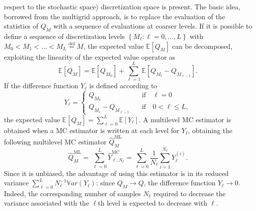 respect to the stochastic space) discretization space is present. The basic idea, borrowed from the multigrid approach,
is to replace the evaluation of the statistics of $Q_M$ with a sequence of evaluations at coarser levels. If it is 
possible to define a sequence of discretization levels $\left\{ M_\ell: \ell = 0, \dots, L \right\}$ with 
$M_0 < M_1 < \dots < M_L \stackrel{\mathrm{def}}{=} M$, the expected value $\mathbb{E}\left[{Q_M}\right]$ can be decomposed, 
exploiting the linearity of the expected value operator as
\begin{equation}
 \mathbb{E}\left[{Q_{M}}\right] = \mathbb{E}\left[{Q_{M_0}}\right] + \sum_{\ell = 1}^L \mathbb{E }\left[ Q_{M_{\ell}} - Q_{M_{\ell-1}} \right].
\end{equation}
If the difference function $Y_\ell$ is defined according to
\begin{equation}
 Y_\ell = \left\{
 \begin{split}
 Q_{M_0} \quad &\mathrm{if} \quad \ell=0 \\
 Q_{M_{\ell}} - Q_{M_{\ell-1}} \quad &\mathrm{if} \quad 0<\ell\leq L,
 \end{split}
 \right.
\end{equation}
the expected value $\mathbb{E}\left[{Q_M}\right]=\sum_{\ell=0}^{L}{  \mathbb{E}\left[Y_\ell\right]   }$. A multilevel MC estimator is obtained when a MC estimator is
written at each level for $Y_\ell$, obtaining the following multilevel MC estimator $\hat{Q}_M^{\mathrm{ML}}$
\begin{equation}
 \hat{Q}_M^{\mathrm{ML}} = \, \sum_{\ell = 0}^L \hat{Y}_{\ell, N_\ell}^{\mathrm{MC}} 
 = \sum_{\ell = 0}^L \frac{1}{N_\ell} \sum_{i=1}^{N_\ell} Y_\ell^{(i)}.
\end{equation}
Since it is unbiased, the advantage of using this estimator is in its reduced variance 
$\sum_{\ell=0}^{L} N_\ell^{-1} \mathbb{V}ar\left({Y_\ell}\right)$: since $Q_M \rightarrow Q$, 
the difference function $Y_\ell \rightarrow 0$. Indeed, the corresponding number of
samples $N_\ell$ required to decrease the variance associated with the $\ell$th level is expected 
to decrease with $\ell$.
 
